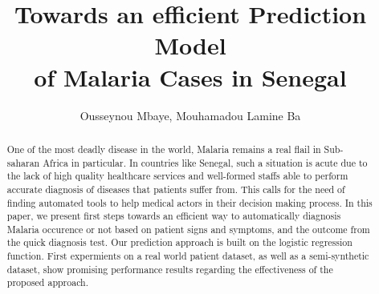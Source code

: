 \documentclass[runningheads]{llncs}
\begin{document}
%
\title{Towards an efficient Prediction Model\\ of Malaria Cases in Senegal}
%
%
\author{Ousseynou Mbaye, Mouhamadou Lamine Ba}
%
%
%
\maketitle              %
%
\begin{abstract}
One of the most deadly disease in the world, Malaria remains a real flail in Sub-saharan Africa 
in particular. In countries like Senegal, such a situation is acute due to the lack of high quality
healthcare services and well-formed staffs able to perform accurate diagnosis of diseases that patients suffer from. 
This calls for the need of finding automated tools to help medical actors in their decision making process.
In this paper, we present first steps towards an efficient way to automatically diagnosis Malaria occurence or not 
based on patient signs and symptoms, and the outcome from the quick diagnosis test. Our prediction approach is built
on the logistic regression function. First expermients on a real world patient dataset, as well as a semi-synthetic dataset,
show promising performance results regarding the effectiveness of the proposed approach.
 
\end{abstract}
%
%












%
%
%
% 
% 
%
\end{document}
